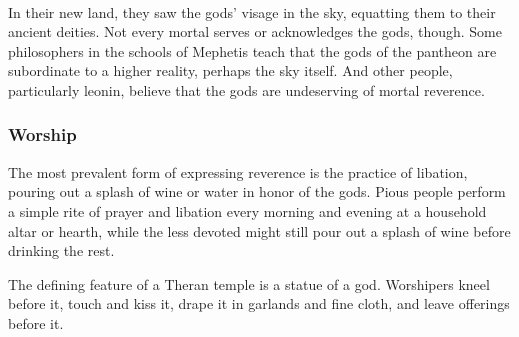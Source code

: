 \pagebreak~
\vspace{14.5cm}

In their new land, they saw the gods' visage in the sky, equatting them to their ancient deities.
Not every mortal serves or acknowledges the gods, though.
Some philosophers in the schools of Mephetis teach that the gods of the pantheon are subordinate to a higher reality, perhaps the sky itself.
And other people, particularly leonin, believe that the gods are undeserving of mortal reverence.

\subsubsection{Worship}
    The most prevalent form of expressing reverence is the practice of libation, pouring out a splash of wine or water in honor of the gods.
    Pious people perform a simple rite of prayer and libation every morning and evening at a household altar or hearth, while the less devoted might still pour out a splash of wine before drinking the rest.

    The defining feature of a Theran temple is a statue of a god.
    Worshipers kneel before it, touch and kiss it, drape it in garlands and fine cloth, and leave offerings before it.



\pagebreak






